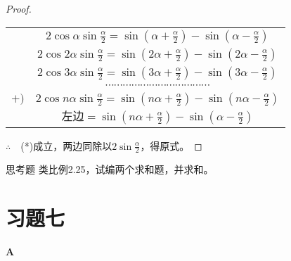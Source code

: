 \begin{proof}
\begin{center}
\begin{tabular}{cc}
& $2\cos\alpha \sin\frac{\alpha}{2}=\sin\left(\alpha+\frac{\alpha}{2}\right)-\sin\left(\alpha-\frac{\alpha}{2}\right)$\\[1.5ex]
&$2\cos2\alpha \sin\frac{\alpha}{2}=\sin\left(2\alpha+\frac{\alpha}{2}\right)-\sin\left(2\alpha-\frac{\alpha}{2}\right) $\\[1.5ex]
&$2\cos3\alpha \sin\frac{\alpha}{2}=\sin\left(3\alpha+\frac{\alpha}{2}\right)-\sin\left(3\alpha-\frac{\alpha}{2}\right) $\\[1.5ex]
&$\cdots \cdots\cdots\cdots \cdots\cdots\cdots \cdots\cdots\cdots \cdots\cdots$\\[1.5ex]
$+)$&$2\cos n\alpha \sin\frac{\alpha}{2}=\sin\left(n\alpha+\frac{\alpha}{2}\right)-\sin\left(n\alpha-\frac{\alpha}{2}\right)  $\\[1.5ex]
\hline
&$\text{左边}=\sin\left(n\alpha+\frac{\alpha}{2}\right)-\sin\left(\alpha-\frac{\alpha}{2}\right)$\\[1.5ex]
\end{tabular}
\end{center}

$\therefore\quad $(*)成立，两边同除以$2\sin\frac{\alpha}{2}$，得原式。
\end{proof}

\begin{thm}
    {思考题} 类比例2.25，试编两个求和题，并求和。
\end{thm}

\section*{习题七}
\begin{center}
    \bfseries A
\end{center}

